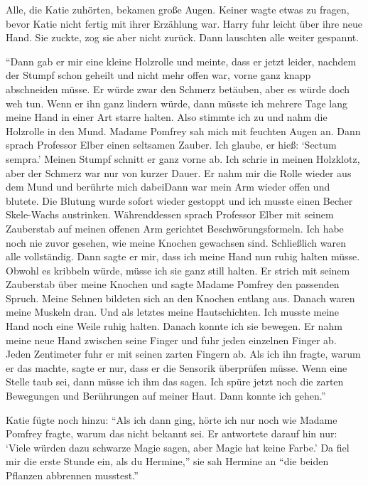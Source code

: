 Alle, die Katie zuhörten, bekamen große Augen. Keiner wagte etwas zu fragen, bevor Katie nicht fertig mit ihrer Erzählung war. Harry fuhr leicht über ihre neue Hand. Sie zuckte, zog sie aber nicht zurück. Dann lauschten alle weiter gespannt.

\enquote{Dann gab er mir eine kleine Holzrolle und meinte, dass er jetzt leider, nachdem der Stumpf schon geheilt und nicht mehr offen war, vorne ganz knapp abschneiden müsse. Er würde zwar den Schmerz betäuben, aber es würde doch weh tun. Wenn er ihn ganz lindern würde, dann müsste ich mehrere Tage lang meine Hand in einer Art starre halten. Also stimmte ich zu und nahm die Holzrolle in den Mund. Madame Pomfrey sah mich mit feuchten Augen an. Dann sprach Professor Elber einen seltsamen Zauber. Ich glaube, er hieß: \enquote{Sectum sempra.} Meinen Stumpf schnitt er ganz vorne ab. Ich schrie in meinen Holzklotz, aber der Schmerz war nur von kurzer Dauer. Er nahm mir die Rolle wieder aus dem Mund und berührte mich dabei\abs Dann war mein Arm wieder offen und blutete. Die Blutung wurde sofort wieder gestoppt und ich musste einen Becher Skele-Wachs austrinken. Währenddessen sprach Professor Elber mit seinem Zauberstab auf meinen offenen Arm gerichtet Beschwörungsformeln. Ich habe noch nie zuvor gesehen, wie meine Knochen gewachsen sind. Schließlich waren alle vollständig. Dann sagte er mir, dass ich meine Hand nun ruhig halten müsse. Obwohl es kribbeln würde, müsse ich sie ganz still halten. Er strich mit seinem Zauberstab über meine Knochen und sagte Madame Pomfrey den passenden Spruch. Meine Sehnen bildeten sich an den Knochen entlang aus. Danach waren meine Muskeln dran. Und als letztes meine Hautschichten. Ich musste meine Hand noch eine Weile ruhig halten. Danach konnte ich sie bewegen. Er nahm meine neue Hand zwischen seine Finger und fuhr jeden einzelnen Finger ab. Jeden Zentimeter fuhr er mit seinen zarten Fingern ab. Als ich ihn fragte, warum er das machte, sagte er nur, dass er die Sensorik überprüfen müsse. Wenn eine Stelle taub sei, dann müsse ich ihm das sagen. Ich spüre jetzt noch die zarten Bewegungen und Berührungen auf meiner Haut. Dann konnte ich gehen.}

Katie fügte noch hinzu: \enquote{Als ich dann ging, hörte ich nur noch wie Madame Pomfrey fragte, warum das nicht bekannt sei. Er antwortete darauf hin nur: \enquote{Viele würden dazu schwarze Magie sagen, aber Magie hat keine Farbe.} Da fiel mir die erste Stunde ein, als du Hermine,} sie sah Hermine an \enquote{die beiden Pflanzen abbrennen musstest.}

